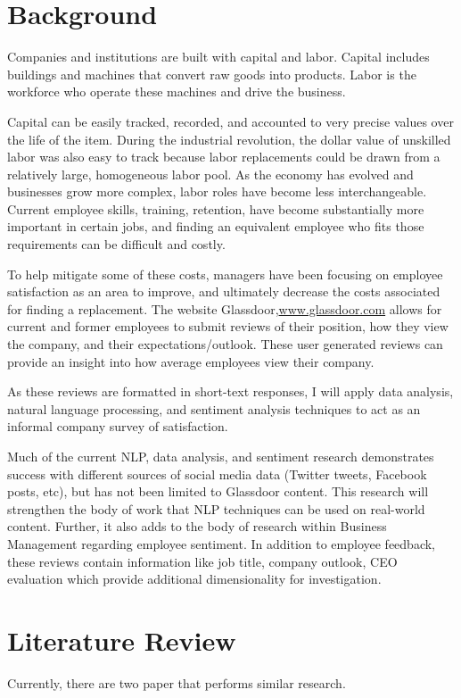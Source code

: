 \documentclass[conference, letterpaper]{IEEEtran}
\begin{document}
\section{Background}
Companies and institutions are built with capital and labor.
Capital includes buildings and machines that convert raw goods into products.
Labor is the workforce who operate these machines and drive the business.

Capital can be easily tracked, recorded, and accounted to very precise values over the life of the item.
During the industrial revolution, the dollar value of unskilled labor was also easy to track because labor replacements could be drawn from a relatively large, homogeneous labor pool.
As the economy has evolved and businesses grow more complex, labor roles have become less interchangeable.
Current employee skills, training, retention, have become substantially more important in certain jobs, and finding an equivalent employee who fits those requirements can be difficult and costly.

To help mitigate some of these costs, managers have been focusing on employee satisfaction as an area to improve, and ultimately decrease the costs associated for finding a replacement.
The website Glassdoor,\url{www.glassdoor.com} allows for current and former employees to submit reviews of their position, how they view the company, and their expectations/outlook.
These user generated reviews can provide an insight into how average employees view their company.

As these reviews are formatted in short-text responses, I will apply data analysis, natural language processing, and sentiment analysis techniques to act as an informal company survey of satisfaction.

Much of the current NLP, data analysis, and sentiment research demonstrates success with different sources of social media data (Twitter tweets, Facebook posts, etc), but has not been limited to Glassdoor content.
This research will strengthen the body of work that NLP techniques can be used on real-world content.
Further, it also adds to the body of research within Business Management regarding employee sentiment.  
In addition to employee feedback, these reviews contain information like job title, company outlook, CEO evaluation which provide additional dimensionality for investigation.


\section{Literature Review}
Currently, there are two paper that performs similar research.
\end{document}
